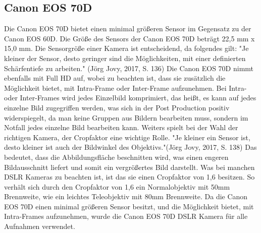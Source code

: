 \subsection{Canon EOS 70D}
Die Canon EOS 70D bietet einen minimal größeren Sensor im Gegensatz zu der Canon EOS 60D. Die Größe des Sensors der Canon EOS 70D beträgt 22,5 mm x 15,0 mm. Die Sensorgröße einer Kamera ist entscheidend, da folgendes gilt: "Je kleiner der Sensor, desto geringer sind die Möglichkeiten, mit einer definierten Schärfentiefe zu arbeiten." (Jörg Jovy, 2017, S. 136)\newline
Die Canon EOS 70D nimmt ebenfalls mit Full HD auf, wobei zu beachten ist, dass sie zusätzlich die Möglichkeit bietet, mit Intra-Frame oder Inter-Frame aufzunehmen.\citep{canon70} Bei Intra- oder Inter-Frames wird jedes Einzelbild komprimiert, das heißt, es kann auf jedes einzelne Bild zugegriffen werden\citep{intra}, was sich in der Post Production positiv widerspiegelt, da man keine Gruppen aus Bildern bearbeiten muss, sondern im Notfall jedes einzelne Bild bearbeiten kann. Weiters spielt bei der Wahl der richtigen Kamera, der Cropfaktor eine wichtige Rolle. "Je kleiner ein Sensor ist, desto kleiner ist auch der Bildwinkel des Objektivs."(Jörg Jovy, 2017, S. 138)\newline
Das bedeutet, dass die Abbildungsfläche beschnitten wird, was einen engeren Bildausschnitt liefert und somit ein vergrößertes Bild darstellt. Was bei manchen DSLR Kameras zu beachten ist, ist das sie einen Cropfaktor von 1,6 besitzen. So verhält sich durch den Cropfaktor von 1,6 ein Normalobjektiv mit 50mm Brennweite, wie ein leichtes Teleobjektiv mit 80mm Brennweite.\citep{crop}
Da die Canon EOS 70D einen minimal größeren Sensor besitzt, und die Möglichkeit bietet, mit Intra-Frames aufzunehmen, wurde die Canon EOS 70D DSLR Kamera für alle Aufnahmen verwendet.
